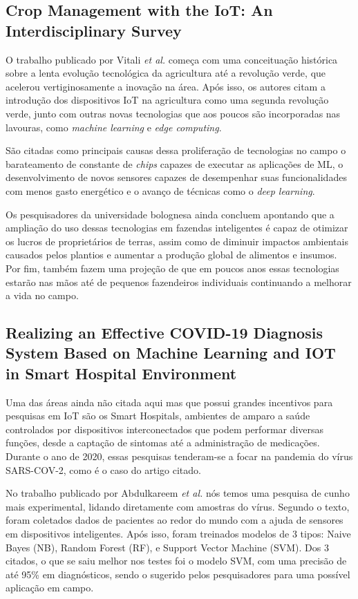 \documentclass[12pt]{article}
\begin{document}
\subsection{Crop Management with the IoT: An Interdisciplinary Survey \cite{vitali}}

O trabalho publicado por Vitali \emph{et al.} começa com uma conceituação histórica sobre a lenta evolução tecnológica da agricultura até a revolução verde, 
que acelerou vertiginosamente a inovação na área. Após isso, os autores citam a introdução dos dispositivos IoT na agricultura como uma segunda revolução verde,
junto com outras novas tecnologias que aos poucos são incorporadas nas lavouras, como \emph{machine learning} e \emph{edge computing}.

São citadas como principais causas dessa proliferação de tecnologias no campo o barateamento de constante de \emph{chips} capazes de executar as aplicações de ML, o desenvolvimento de novos sensores capazes de desempenhar suas funcionalidades com menos gasto energético e o avanço de técnicas como o \emph{deep learning}.

Os pesquisadores da universidade bolognesa ainda concluem apontando que a ampliação do uso dessas tecnologias em fazendas inteligentes é capaz de otimizar os lucros de proprietários de terras, assim como de diminuir impactos ambientais causados pelos plantios e aumentar a produção global de alimentos e insumos. Por fim, também fazem uma projeção de que em poucos anos essas tecnologias estarão nas mãos até de pequenos fazendeiros individuais continuando a melhorar a vida no campo.

\subsection{Realizing an Effective COVID-19 Diagnosis System Based on Machine Learning and IOT in Smart Hospital Environment \cite{hameed}}

Uma das áreas ainda não citada aqui mas que possui grandes incentivos para pesquisas em IoT são os Smart Hospitals, ambientes de amparo a saúde controlados por dispositivos interconectados que podem performar diversas funções, desde a captação de sintomas até a administração de medicações. Durante o ano de 2020, essas pesquisas tenderam-se a focar na pandemia do vírus SARS-COV-2, como é o caso do artigo citado.

No trabalho publicado por Abdulkareem \emph{et al.} nós temos uma pesquisa de cunho mais experimental, lidando diretamente com amostras do vírus. Segundo o texto, foram coletados dados de pacientes ao redor do mundo com a ajuda de sensores em dispositivos inteligentes. Após isso, foram treinados modelos de 3 tipos: Naive Bayes (NB), Random Forest (RF), e Support Vector Machine (SVM). Dos 3 citados, o que se saiu melhor nos testes foi o modelo SVM, com uma precisão de até 95\% em diagnósticos, sendo o sugerido pelos pesquisadores para uma possível aplicação em campo.
\end{document}
